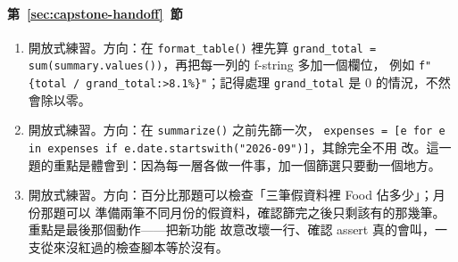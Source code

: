 \paragraph{第~\ref{sec:capstone-handoff}~節}
\begin{enumerate}
\item 開放式練習。方向：在 \texttt{format\_table()} 裡先算
\texttt{grand\_total = sum(summary.values())}，再把每一列的 f-string 多加一個欄位，
例如 \texttt{f"\{total / grand\_total:>8.1\%\}"}；記得處理 \texttt{grand\_total} 是 0
的情況，不然會除以零。
\item 開放式練習。方向：在 \texttt{summarize()} 之前先篩一次，
\texttt{expenses = [e for e in expenses if e.date.startswith("2026-09")]}，其餘完全不用
改。這一題的重點是體會到：因為每一層各做一件事，加一個篩選只要動一個地方。
\item 開放式練習。方向：百分比那題可以檢查「三筆假資料裡 Food 佔多少」；月份那題可以
準備兩筆不同月份的假資料，確認篩完之後只剩該有的那幾筆。重點是最後那個動作——把新功能
故意改壞一行、確認 assert 真的會叫，一支從來沒紅過的檢查腳本等於沒有。
\end{enumerate}
